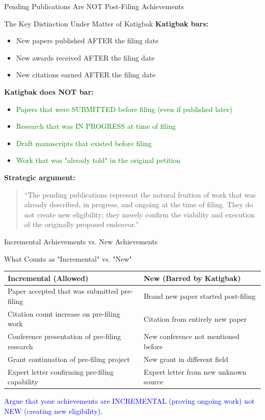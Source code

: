 \documentclass[11pt]{beamer}
\begin{document}
	\begin{frame}{Pending Publications Are NOT Post-Filing Achievements}
		\scriptsize
		\begin{block}{The Key Distinction Under Matter of Katigbak}
			\textbf{Katigbak bars:}
			\begin{itemize}
				\item New papers published AFTER the filing date
				\item New awards received AFTER the filing date
				\item New citations earned AFTER the filing date
			\end{itemize}
			\textbf{Katigbak does NOT bar:}
			\begin{itemize}
				\item \textcolor{green}{Papers that were SUBMITTED before filing (even if published later)}
				\item \textcolor{green}{Research that was IN PROGRESS at time of filing}
				\item \textcolor{green}{Draft manuscripts that existed before filing}
				\item \textcolor{green}{Work that was "already told" in the original petition}
			\end{itemize}
			\textbf{Strategic argument:}
			\begin{quote}
				``The pending publications represent the natural fruition of work that was already described, in progress, and ongoing at the time of filing. They do not create new eligibility; they merely confirm the viability and execution of the originally proposed endeavor.''
			\end{quote}
		\end{block}
	\end{frame}
	
	\begin{frame}{Incremental Achievements vs. New Achievements}
		\scriptsize
		\begin{block}{What Counts as "Incremental" vs. "New"}
			\centering
			\begin{tabular}{|p{4cm}|p{5cm}|}
				\hline
				\textbf{Incremental (Allowed)} & \textbf{New (Barred by Katigbak)} \\
				\hline
				Paper accepted that was submitted pre-filing & Brand new paper started post-filing \\
				\hline
				Citation count increase on pre-filing work & Citation from entirely new paper \\
				\hline
				Conference presentation of pre-filing research & New conference not mentioned before \\
				\hline
				Grant continuation of pre-filing project & New grant in different field \\
				\hline
				Expert letter confirming pre-filing capability & Expert letter from new unknown source \\
				\hline
			\end{tabular}
			\vspace{0.2cm}
			\textcolor{blue}{Argue that your achievements are INCREMENTAL (proving ongoing work) not NEW (creating new eligibility).}
		\end{block}
	\end{frame}
	
\end{document}
